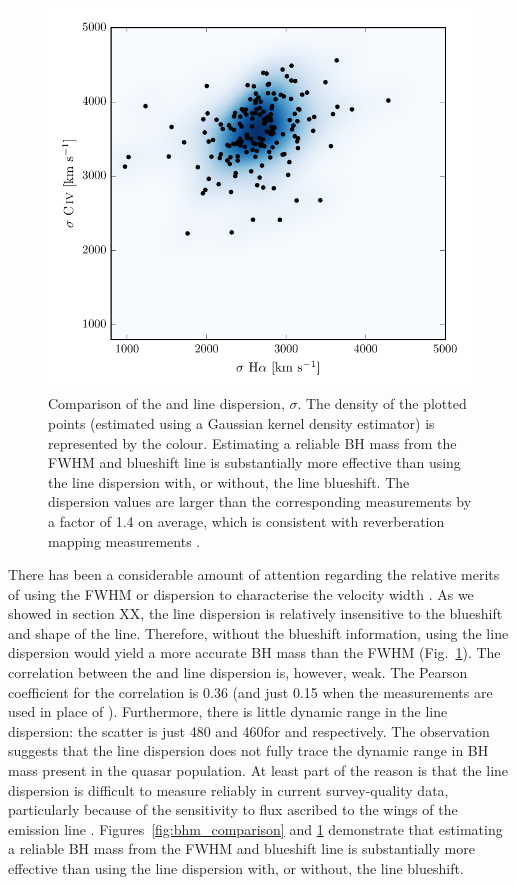 \begin{figure}
    \centering 
    \includegraphics[width=0.8\columnwidth]{figures/chapter03/dispersion_comparison.pdf} 
    \caption{Comparison of the  and \ha line dispersion, $\sigma$. The density of the plotted points (estimated using a Gaussian kernel density estimator) is represented by the colour. Estimating a reliable BH mass from the  FWHM and blueshift line is substantially more effective than using the  line dispersion with, or without, the line blueshift. The  dispersion values are larger than the corresponding \ha measurements by a factor of 1.4 on average, which is consistent with reverberation mapping measurements \citep{vestergaard06}.} 
    \label{fig:dispersion_comparison}
\end{figure}

There has been a considerable amount of attention regarding the relative merits of using the FWHM or dispersion to characterise the velocity width \citep[e.g.][]{denney13}.
As we showed in section XX, the line dispersion is relatively insensitive to the blueshift and shape of the  line. 
Therefore, without the blueshift information, using the line dispersion would yield a more accurate BH mass than the FWHM (Fig.~\ref{fig:dispersion_comparison}). 
The correlation between the \ha and  line dispersion is, however, weak. 
The Pearson coefficient for the correlation is 0.36 (and just 0.15 when the \hb measurements are used in place of \hans). 
Furthermore, there is little dynamic range in the line dispersion: the scatter is just 480 and 460\kms for \ha and  respectively. The observation suggests that the line dispersion does not fully trace the dynamic range in BH mass present in the quasar population. 
At least part of the reason is that the line dispersion is difficult to measure reliably in current survey-quality data, particularly because of the sensitivity to flux ascribed to the wings of the emission line \citep[e.g.][]{mejia-restrepo16}. 
Figures~\ref{fig:bhm_comparison} and \ref{fig:dispersion_comparison} demonstrate that estimating a reliable BH mass from the  FWHM and blueshift line is substantially more effective than using the  line dispersion with, or without, the line blueshift. 

